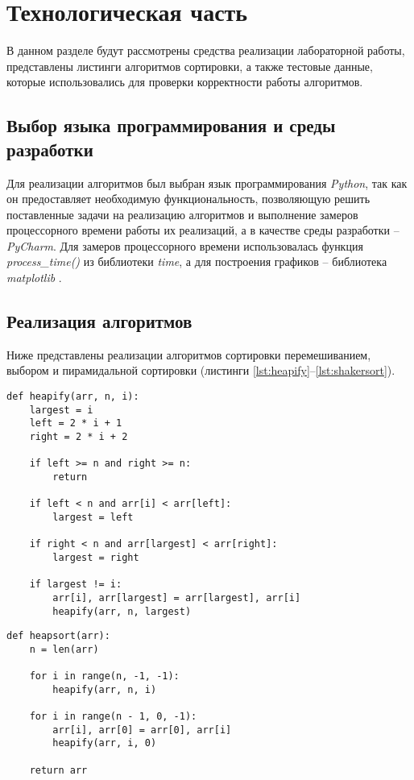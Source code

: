 \chapter{Технологическая часть}

В данном разделе будут рассмотрены средства реализации лабораторной работы, представлены листинги алгоритмов сортировки, а также тестовые данные, которые использовались для проверки корректности работы алгоритмов.


\section{Выбор языка программирования и среды разработки}
Для реализации алгоритмов был выбран язык программирования \textit{Python}, так как он предоставляет необходимую функциональность, позволяющую решить поставленные задачи на реализацию алгоритмов и выполнение замеров процессорного времени работы их реализаций, а в качестве среды разработки -- \textit{PyCharm}.
Для замеров процессорного времени использовалась функция \textit{process\_time()} \cite{time} из библиотеки \textit{time}, а для построения графиков -- библиотека \textit{matplotlib} \cite{mpl}.

\section{Реализация алгоритмов}
Ниже представлены реализации алгоритмов сортировки перемешиванием, выбором и пирамидальной сортировки (листинги \ref{lst:heapify}--\ref{lst:shakersort}).

\begin{center}
    \captionsetup{justification=raggedright,singlelinecheck=off}
    \begin{lstlisting}[label=lst:heapify,caption= Пирамидальная сортировка (перестройка сортирующего дерева)]
def heapify(arr, n, i):
    largest = i
    left = 2 * i + 1
    right = 2 * i + 2

    if left >= n and right >= n:
        return

    if left < n and arr[i] < arr[left]:
        largest = left

    if right < n and arr[largest] < arr[right]:
        largest = right

    if largest != i:
        arr[i], arr[largest] = arr[largest], arr[i]
        heapify(arr, n, largest)
\end{lstlisting}
\end{center}


\begin{center}
    \captionsetup{justification=raggedright,singlelinecheck=off}
    \begin{lstlisting}[label=lst:heapsort,caption=Пирамидальная сортировка]
def heapsort(arr):
    n = len(arr)

    for i in range(n, -1, -1):
        heapify(arr, n, i)

    for i in range(n - 1, 0, -1):
        arr[i], arr[0] = arr[0], arr[i]
        heapify(arr, i, 0)

    return arr
\end{lstlisting}
\end{center}


